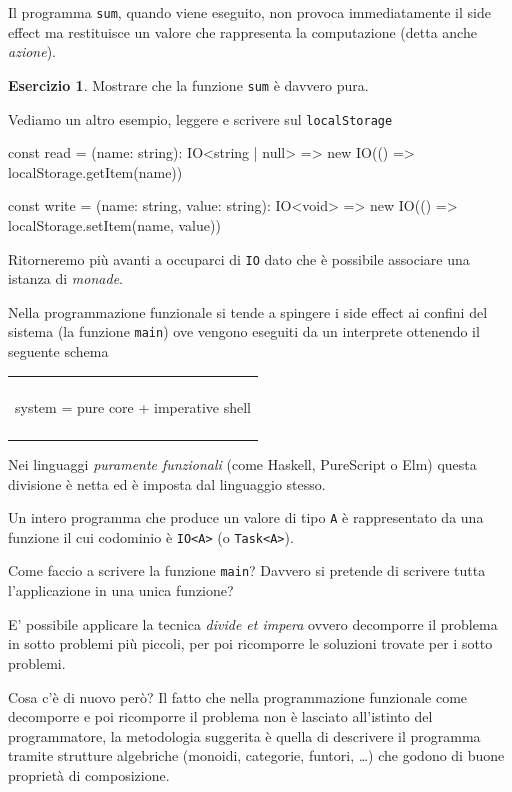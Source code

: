 \documentclass[12pt]{article}
\theoremstyle{definition}
\newtheorem{exercise}{Esercizio}[section]
\newenvironment{demo}
    {\begin{center}
    \begin{tabular}{|p{0.9\textwidth}|}
    \hline\\
    }
    {
    \\\\\hline
    \end{tabular}
    \end{center}
    }
\newenvironment{code}
  {\vspace{0.5cm} \VerbatimEnvironment\begin{typescriptcode}}
  {\end{typescriptcode} \vspace{0.2cm}}
\begin{document}
Il programma \texttt{sum}, quando viene eseguito, non provoca immediatamente il side effect ma restituisce un valore che rappresenta
la computazione (detta anche \emph{azione}).

\begin{exercise}
Mostrare che la funzione \texttt{sum} è davvero pura.
\end{exercise}

Vediamo un altro esempio, leggere e scrivere sul \texttt{localStorage}

\begin{code}
const read = (name: string): IO<string | null> =>
  new IO(() => localStorage.getItem(name))

const write = (name: string, value: string): IO<void> =>
  new IO(() => localStorage.setItem(name, value))
\end{code}

Ritorneremo più avanti a occuparci di \texttt{IO} dato che è possibile associare una istanza di \emph{monade}.

Nella programmazione funzionale si tende a spingere i side effect ai confini del sistema (la funzione \texttt{main})
ove vengono eseguiti da un interprete ottenendo il seguente schema

\begin{demo}
\begin{center}
system = pure core + imperative shell
\end{center}
\end{demo}

Nei linguaggi \emph{puramente funzionali} (come Haskell, PureScript o Elm) questa divisione è netta ed è imposta dal linguaggio stesso.

Un intero programma che produce un valore di tipo \texttt{A} è rappresentato da una funzione il cui codominio è \texttt{IO<A>} (o \texttt{Task<A>}).

Come faccio a scrivere la funzione \texttt{main}? Davvero si pretende di scrivere tutta l'applicazione in una unica funzione?

E' possibile applicare la tecnica \emph{divide et impera} ovvero decomporre il problema in sotto problemi più piccoli,
per poi ricomporre le soluzioni trovate per i sotto problemi.

Cosa c'è di nuovo però? Il fatto che nella programmazione funzionale come decomporre e poi ricomporre il problema non è lasciato
all'istinto del programmatore, la metodologia suggerita è quella di descrivere il programma tramite strutture algebriche
(monoidi, categorie, funtori, \ldots) che godono di buone proprietà di composizione.
\end{document}
